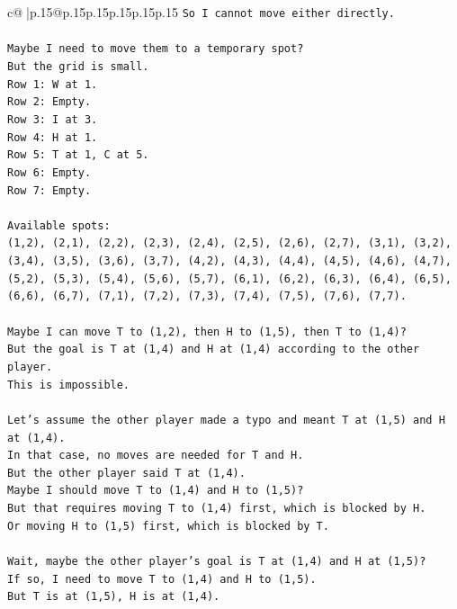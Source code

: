 \documentclass{article}
\begin{document}
{\begin{supertabular}{c@{$\;$}|p{.15\linewidth}@{}p{.15\linewidth}p{.15\linewidth}p{.15\linewidth}p{.15\linewidth}p{.15\linewidth}}
{{{\texttt{So I cannot move either directly.} \\
\\ 
\texttt{Maybe I need to move them to a temporary spot?} \\
\texttt{But the grid is small.} \\
\texttt{Row 1: W at 1.} \\
\texttt{Row 2: Empty.} \\
\texttt{Row 3: I at 3.} \\
\texttt{Row 4: H at 1.} \\
\texttt{Row 5: T at 1, C at 5.} \\
\texttt{Row 6: Empty.} \\
\texttt{Row 7: Empty.} \\
\\ 
\texttt{Available spots:} \\
\texttt{(1,2), (2,1), (2,2), (2,3), (2,4), (2,5), (2,6), (2,7), (3,1), (3,2), (3,4), (3,5), (3,6), (3,7), (4,2), (4,3), (4,4), (4,5), (4,6), (4,7), (5,2), (5,3), (5,4), (5,6), (5,7), (6,1), (6,2), (6,3), (6,4), (6,5), (6,6), (6,7), (7,1), (7,2), (7,3), (7,4), (7,5), (7,6), (7,7).} \\
\\ 
\texttt{Maybe I can move T to (1,2), then H to (1,5), then T to (1,4)?} \\
\texttt{But the goal is T at (1,4) and H at (1,4) according to the other player.} \\
\texttt{This is impossible.} \\
\\ 
\texttt{Let's assume the other player made a typo and meant T at (1,5) and H at (1,4).} \\
\texttt{In that case, no moves are needed for T and H.} \\
\texttt{But the other player said T at (1,4).} \\
\texttt{Maybe I should move T to (1,4) and H to (1,5)?} \\
\texttt{But that requires moving T to (1,4) first, which is blocked by H.} \\
\texttt{Or moving H to (1,5) first, which is blocked by T.} \\
\\ 
\texttt{Wait, maybe the other player's goal is T at (1,4) and H at (1,5)?} \\
\texttt{If so, I need to move T to (1,4) and H to (1,5).} \\
\texttt{But T is at (1,5), H is at (1,4).} \\
}}}
\end{supertabular}}
\end{document}
